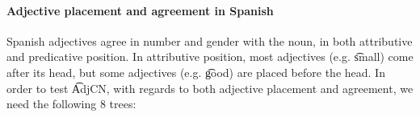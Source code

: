 

\paragraph{Adjective placement and agreement in Spanish}
Spanish adjectives agree in number and gender with the noun, in both
attributive and predicative position. In attributive position, most
adjectives (e.g. \t{small}) come after its head, but some adjectives
(e.g. \t{good}) are placed before the head. 
In order to test \t{AdjCN}, with regards to both adjective placement
and agreement, we need the following 8 trees: 
